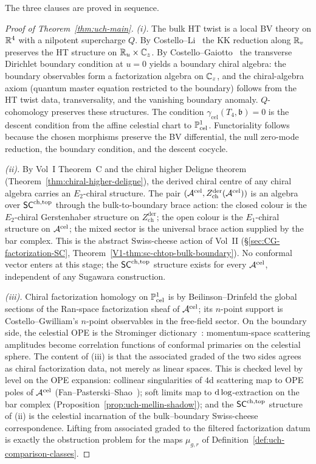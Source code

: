 The three clauses are proved in sequence.

\begin{proof}[Proof of Theorem~\ref{thm:uch-main}]
\emph{(i).}
The bulk HT twist is a local BV theory on $\mathbb R^4$ with a nilpotent
supercharge $Q$. By Costello--Li~\cite[Thm.~6.2]{CL16}
the KK reduction along $\mathbb R_v$ preserves the HT structure on $\mathbb R_u
\times \mathbb C_z$. By Costello--Gaiotto~\cite{CostelloGaiottoBoundaryVOA}
the transverse Dirichlet boundary condition at $u=0$ yields a
boundary chiral algebra: the boundary observables form a
factorization algebra on $\mathbb C_z$, and the chiral-algebra axiom
(quantum master equation restricted to the boundary) follows from
the HT twist data, transversality, and the vanishing
boundary anomaly. $Q$-cohomology preserves these structures. The
condition $\gamma_{\mathrm{cel}}(T_4,\mathfrak b)=0$ is the
descent condition from the affine celestial chart to
$\mathbb P^1_{\text{cel}}$. Functoriality follows because the chosen
morphisms preserve the BV differential, the null zero-mode reduction,
the boundary condition, and the descent cocycle.

\emph{(ii).}
By Vol~I Theorem~C and the chiral higher Deligne theorem
(Theorem~\ref{thm:chiral-higher-deligne}), the derived chiral centre
of any chiral algebra carries an $E_2$-chiral structure. The pair
$(\mathcal A^{\mathrm{cel}}, Z^{\mathrm{der}}_{\mathrm{ch}}(\mathcal A^{\mathrm{cel}}))$
is an algebra over $\mathsf{SC}^{\mathrm{ch,top}}$ through the bulk-to-boundary brace action:
the closed colour is the $E_2$-chiral Gerstenhaber structure on
$Z^{\mathrm{der}}_{\mathrm{ch}}$; the open colour is the $E_1$-chiral
structure on $\mathcal A^{\mathrm{cel}}$; the mixed sector is the universal
brace action supplied by the bar complex. This is the abstract
Swiss-cheese action of Vol~II
(\S\ref{sec:CG-factorization-SC}, Theorem~\ref{V1-thm:sc-chtop-bulk-boundary}).
No conformal vector enters at this stage; the $\mathsf{SC}^{\mathrm{ch,top}}$ structure
exists for every $\mathcal A^{\mathrm{cel}}$, independent of any Sugawara construction.

\emph{(iii).}
Chiral factorization homology on $\mathbb P^1_{\text{cel}}$ is by
Beilinson--Drinfeld \cite{BeilinsonDrinfeldChiral} the global sections
of the Ran-space factorization sheaf of $\mathcal A^{\mathrm{cel}}$; its
$n$-point support is Costello--Gwilliam's $n$-point observables in the
free-field sector. On the boundary side, the celestial OPE is the
Strominger dictionary~\cite{StromingerLectures2018}: momentum-space
scattering amplitudes become correlation functions of conformal
primaries on the celestial sphere. The content of (iii) is that the
associated graded of the two sides agrees as chiral factorization
data, not merely as linear spaces. This is checked level by level on
the OPE expansion:
collinear singularities of $4$d scattering map to OPE poles of
$\mathcal A^{\mathrm{cel}}$ (Fan--Pasterski--Shao~\cite{FanPasterskiShaoCelOPE});
soft limits map to $\mathrm d\log$-extraction on the bar complex
(Proposition~\ref{prop:uch-mellin-shadow}); and the $\mathsf{SC}^{\mathrm{ch,top}}$
structure of (ii) is the celestial incarnation of the bulk--boundary
Swiss-cheese correspondence. Lifting from associated graded to the
filtered factorization datum is exactly the obstruction problem for
the maps $\mu_{g,r}$ of Definition~\ref{def:uch-comparison-classes}.
\end{proof}

